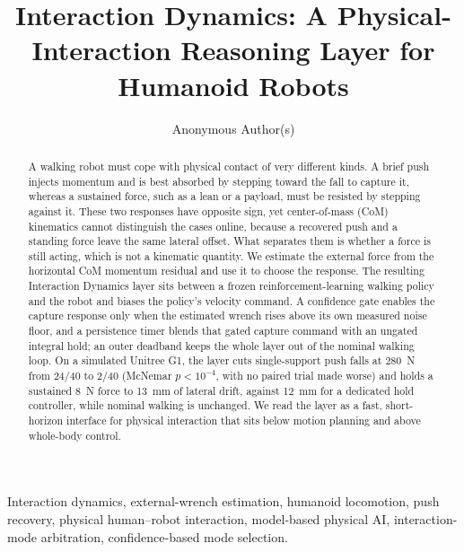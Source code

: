 \documentclass[journal]{IEEEtran}
\begin{document}
\title{Interaction Dynamics: A Physical-Interaction Reasoning Layer for Humanoid Robots}

\author{Anonymous Author(s)}


\maketitle

\begin{abstract}
A walking robot must cope with physical contact of very different kinds. A brief push injects momentum and is best absorbed by stepping toward the fall to capture it, whereas a sustained force, such as a lean or a payload, must be resisted by stepping against it. These two responses have opposite sign, yet center-of-mass (CoM) kinematics cannot distinguish the cases online, because a recovered push and a standing force leave the same lateral offset. What separates them is whether a force is still acting, which is not a kinematic quantity. We estimate the external force from the horizontal CoM momentum residual and use it to choose the response. The resulting Interaction Dynamics layer sits between a frozen reinforcement-learning walking policy and the robot and biases the policy's velocity command. A confidence gate enables the capture response only when the estimated wrench rises above its own measured noise floor, and a persistence timer blends that gated capture command with an ungated integral hold; an outer deadband keeps the whole layer out of the nominal walking loop. On a simulated Unitree G1, the layer cuts single-support push falls at 280~N from 24/40 to 2/40 (McNemar $p<10^{-4}$, with no paired trial made worse) and holds a sustained 8~N force to 13~mm of lateral drift, against 12~mm for a dedicated hold controller, while nominal walking is unchanged. We read the layer as a fast, short-horizon interface for physical interaction that sits below motion planning and above whole-body control.
\end{abstract}

\begin{IEEEkeywords}
Interaction dynamics, external-wrench estimation, humanoid locomotion, push recovery, physical human--robot interaction, model-based physical AI, interaction-mode arbitration, confidence-based mode selection.
\end{IEEEkeywords}
\end{document}
